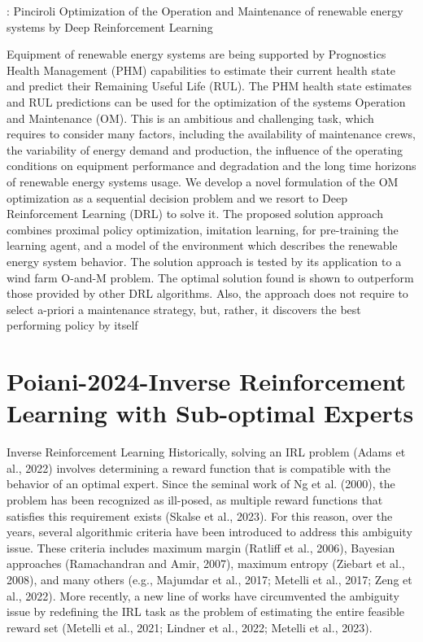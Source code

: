 \documentclass{article}
\begin{document}
\cite{Pinciroli2022-752}: Pinciroli Optimization of the Operation and Maintenance of renewable energy systems by Deep Reinforcement Learning

Equipment of renewable energy systems are being supported by Prognostics  Health Management (PHM) capabilities to estimate their current health state and predict their Remaining Useful Life (RUL). The PHM health state estimates and RUL predictions can be used for the optimization of the systems Operation and Maintenance (OM). This is an ambitious and challenging task, which requires to consider many factors, including the availability of maintenance crews, the variability of energy demand and production, the influence of the operating conditions on equipment performance and degradation and the long time horizons of renewable energy systems usage. We develop a novel formulation of the OM optimization as a sequential decision problem and we resort to Deep Reinforcement Learning (DRL) to solve it. The proposed solution approach combines proximal policy optimization, imitation learning, for pre-training the learning agent, and a model of the environment which describes the renewable energy system behavior. The solution approach is tested by its application to a wind farm O-and-M problem. The optimal solution found is shown to outperform those provided by other DRL algorithms. Also, the approach does not require to select a-priori a maintenance strategy, but, rather, it discovers the best performing policy by itself



\section{Poiani-2024-Inverse Reinforcement Learning with Sub-optimal Experts}

Inverse Reinforcement Learning Historically,
solving an IRL problem (Adams et al., 2022) involves
determining a reward function that is compatible with
the behavior of an optimal expert. Since the seminal
work of Ng et al. (2000), the problem has been recognized
as ill-posed, as multiple reward functions that
satisfies this requirement exists (Skalse et al., 2023).
For this reason, over the years, several algorithmic
criteria have been introduced to address this ambiguity
issue. These criteria includes maximum margin
(Ratliff et al., 2006), Bayesian approaches (Ramachandran
and Amir, 2007), maximum entropy (Ziebart
et al., 2008), and many others (e.g., Majumdar et al.,
2017; Metelli et al., 2017; Zeng et al., 2022). More
recently, a new line of works have circumvented the
ambiguity issue by redefining the IRL task as the problem
of estimating the entire feasible reward set (Metelli
et al., 2021; Lindner et al., 2022; Metelli et al., 2023).
\end{document}
